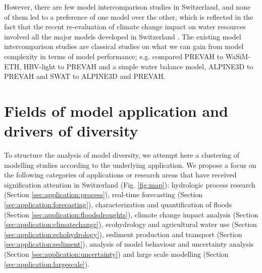 \documentclass[10pt,a4paper]{article}
\begin{document}
However, there are few model intercomparison studies in Switzerland, and none of
them led to a preference of one model over the other, which is reflected
in the fact that the recent re-evaluation of climate change impact on
water resources involved all the major models developed in Switzerland
 \citep{bafu2021}. The existing model intercomparison studies are
classical studies on what we can gain from model complexity in terms of
model performance; e.g. \citet{Gurtz2003} compared PREVAH to
WaSiM-ETH, \citet{Orth2015} HBV-light to PREVAH and a simple water
balance model, \citet{Kobierska_2013} ALPINE3D to PREVAH
and \citet{Andrianaki2019} SWAT to ALPINE3D and PREVAH.


\section{Fields of model application and drivers of diversity}
\label{sec:application}

To structure the analysis of model diversity, we attempt here a
clustering of modelling studies according to the underlying application.
We propose a focus on the following categories of applications or
research areas that have received signification attention in Switzerland
(Fig. \ref{fig:map}): hydrologic process research
(Section \ref{sec:application:process}), real-time forecasting 
(Section \ref{sec:application:forecasting}), characterization and 
quantification of floods (Section \ref{sec:application:floodsdroughts}), 
climate change impact analysis (Section \ref{sec:application:climatechange}), 
ecohydrology and agricultural water use (Section \ref{sec:application:echohydrology}),
sediment production and transport (Section \ref{sec:application:sediment}), analysis of model
behaviour and uncertainty analysis (Section \ref{sec:application:uncertainty}) and large scale
modelling (Section \ref{sec:application:largescale}).
\end{document}
